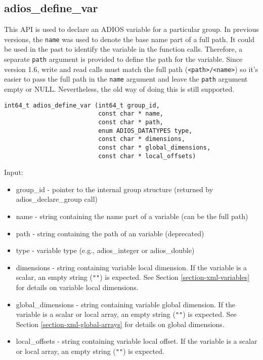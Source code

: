\subsection{adios\_define\_var}

This API is used to declare an ADIOS variable for a particular group. In previous versions, the \verb+name+ was used to denote the base name part of a full path. It could be used in the past to identify the variable in the function calls. Therefore, a separate \verb+path+ argument is provided to define the path for the variable. Since version 1.6, write and read calls must match the full path (\verb+<path>/<name>+) so it's easier to pass the full path in the \verb+name+ argument and leave the \verb+path+ argument empty or NULL. Nevertheless, the old way of doing this is still supported.  

\begin{lstlisting}[alsolanguage=C,caption={},label={}]
int64_t adios_define_var (int64_t group_id, 
                          const char * name,
                          const char * path,
                          enum ADIOS_DATATYPES type,
                          const char * dimensions,
                          const char * global_dimensions,
                          const char * local_offsets)
\end{lstlisting}

Input: 
\begin{itemize}
\item group\_id - pointer to the internal group structure (returned by adios\_declare\_group 
call)

\item name - string containing the name part of a variable (can be the full path)

\item path - string containing the path of an variable (deprecated)

\item type - variable type (e.g., adios\_integer or adios\_double) 

\item dimensions - string containing variable local dimension. 
If the variable is a scalar, an empty string (\verb+""+) is expected. 
See Section \ref{section-xml-variables} for details on variable local dimensions.

\item global\_dimensions - string containing variable global dimension. If the variable 
is a scalar or local array, an empty string (\verb+""+) is expected. 
See Section \ref{section-xml-global-arrays} for details on global dimensions.

\item local\_offsets - string containing variable local offset. If the variable is a 
scalar or local array, an empty string (\verb+""+) is expected.
\end{itemize}

